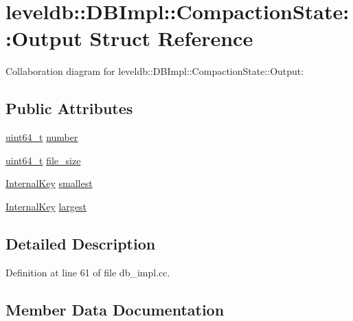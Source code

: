 \hypertarget{structleveldb_1_1_d_b_impl_1_1_compaction_state_1_1_output}{}\section{leveldb\+:\+:D\+B\+Impl\+:\+:Compaction\+State\+:\+:Output Struct Reference}
\label{structleveldb_1_1_d_b_impl_1_1_compaction_state_1_1_output}


Collaboration diagram for leveldb\+:\+:D\+B\+Impl\+:\+:Compaction\+State\+:\+:Output\+:
\subsection*{Public Attributes}
\begin{DoxyCompactItemize}
\item 
\hyperlink{stdint_8h_aaa5d1cd013383c889537491c3cfd9aad}{uint64\+\_\+t} \hyperlink{structleveldb_1_1_d_b_impl_1_1_compaction_state_1_1_output_aa4b759dca2a83bdb8d9edbf7e2d213e2}{number}
\item 
\hyperlink{stdint_8h_aaa5d1cd013383c889537491c3cfd9aad}{uint64\+\_\+t} \hyperlink{structleveldb_1_1_d_b_impl_1_1_compaction_state_1_1_output_a37906cee65a9d1873b7b7a4169f22402}{file\+\_\+size}
\item 
\hyperlink{classleveldb_1_1_internal_key}{Internal\+Key} \hyperlink{structleveldb_1_1_d_b_impl_1_1_compaction_state_1_1_output_a88ada857d0cf32ae8e76d7baf4e80c69}{smallest}
\item 
\hyperlink{classleveldb_1_1_internal_key}{Internal\+Key} \hyperlink{structleveldb_1_1_d_b_impl_1_1_compaction_state_1_1_output_a6e257f231aba82d20cb7199a552b2a63}{largest}
\end{DoxyCompactItemize}


\subsection{Detailed Description}


Definition at line 61 of file db\+\_\+impl.\+cc.



\subsection{Member Data Documentation}
\hypertarget{structleveldb_1_1_d_b_impl_1_1_compaction_state_1_1_output_a37906cee65a9d1873b7b7a4169f22402}{}
